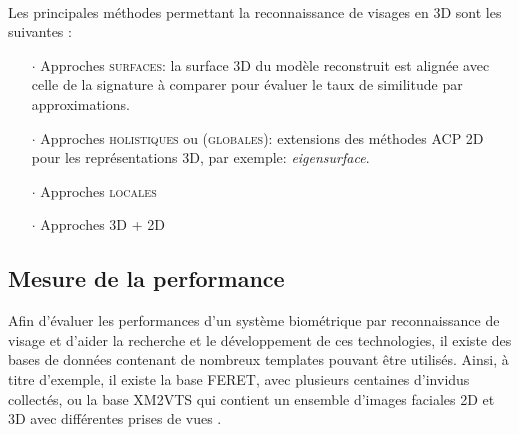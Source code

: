 \paragraph{}
Les principales méthodes permettant la reconnaissance de visages en 3D sont les suivantes \cite{Xphdthesis_2}:
\begin{itemize}\setlength{\itemsep}{.2em}
\item[$\cdot$]Approches \textsc{surfaces}: la surface 3D du modèle reconstruit est alignée avec celle de la signature à comparer pour évaluer le taux de similitude par approximations.
\item[$\cdot$]Approches \textsc{holistiques} ou (\textsc{globales}): extensions des méthodes ACP 2D pour les représentations 3D, par exemple: \textit{eigensurface}.
\item[$\cdot$]Approches \textsc{locales}
\item[$\cdot$]Approches \textsc{3D + 2D}
\end{itemize}
 
\subsection{Mesure de la performance}
Afin d'évaluer les performances d'un système biométrique par reconnaissance de visage et d'aider la recherche et le développement de ces technologies, il existe des bases de données contenant de nombreux templates pouvant être utilisés. Ainsi, à titre d'exemple, il existe la base FERET, avec plusieurs centaines d'invidus collectés, ou la base XM2VTS qui contient un ensemble d'images faciales 2D et 3D avec différentes prises de vues \cite{Xphdthesis_3}.

